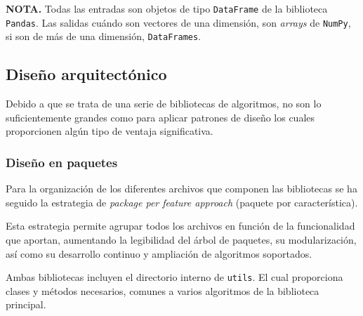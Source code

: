 \textbf{NOTA.} Todas las entradas son objetos de tipo \texttt{DataFrame} de la biblioteca \texttt{Pandas}. Las salidas cuándo son vectores de una dimensión, son \textit{arrays} de \texttt{NumPy}, si son de más de una dimensión, \texttt{DataFrames}.

\subsection{Diseño arquitectónico}
Debido a que se trata de una serie de bibliotecas de algoritmos, no son lo suficientemente grandes como para aplicar patrones de diseño los cuales proporcionen algún tipo de ventaja significativa. 

\subsubsection{Diseño en paquetes}
Para la organización de los diferentes archivos que componen las bibliotecas se ha seguido la estrategia de \textit{package per feature approach} (paquete por característica).

Esta estrategia permite agrupar todos los archivos en función de la funcionalidad que aportan, aumentando la legibilidad del árbol de paquetes, su modularización, así como su desarrollo continuo y ampliación de algoritmos soportados.

Ambas bibliotecas incluyen el directorio interno de \texttt{utils}. El cual proporciona clases y métodos necesarios, comunes a varios algoritmos de la biblioteca principal. 
